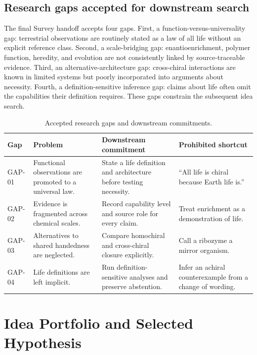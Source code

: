 \documentclass[conference]{IEEEtran}
\begin{document}
\subsection{Research gaps accepted for downstream search}

The final Survey handoff accepts four gaps. First, a function-versus-universality gap: terrestrial observations are routinely stated as a law of all life without an explicit reference class. Second, a scale-bridging gap: enantioenrichment, polymer function, heredity, and evolution are not consistently linked by source-traceable evidence. Third, an alternative-architecture gap: cross-chiral interactions are known in limited systems but poorly incorporated into arguments about necessity. Fourth, a definition-sensitive inference gap: claims about life often omit the capabilities their definition requires. These gaps constrain the subsequent idea search.

\begin{table}[!t]
\caption{Accepted research gaps and downstream commitments.}
\label{tab:gaps}
\centering
\renewcommand{\arraystretch}{1.18}
\begin{tabular}{|P{0.15\textwidth}|P{0.26\textwidth}|P{0.29\textwidth}|P{0.18\textwidth}|}
\hline
\textbf{Gap} & \textbf{Problem} & \textbf{Downstream commitment} & \textbf{Prohibited shortcut} \\
\hline
GAP-01 & Functional observations are promoted to a universal law. & State a life definition and architecture before testing necessity. & ``All life is chiral because Earth life is.'' \\
\hline
GAP-02 & Evidence is fragmented across chemical scales. & Record capability level and source role for every claim. & Treat enrichment as a demonstration of life. \\
\hline
GAP-03 & Alternatives to shared handedness are neglected. & Compare homochiral and cross-chiral closure explicitly. & Call a ribozyme a mirror organism. \\
\hline
GAP-04 & Life definitions are left implicit. & Run definition-sensitive analyses and preserve abstention. & Infer an achiral counterexample from a change of wording. \\
\hline
\end{tabular}
\end{table}

\section{Idea Portfolio and Selected Hypothesis}
\end{document}
